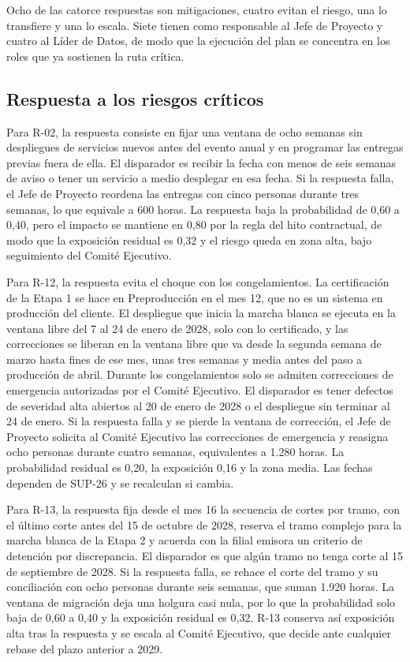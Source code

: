 \documentclass[11pt]{article}
\begin{document}
Ocho de las catorce respuestas son mitigaciones, cuatro evitan el riesgo, una lo transfiere y una lo escala. Siete tienen como responsable al Jefe de Proyecto y cuatro al Líder de Datos, de modo que la ejecución del plan se concentra en los roles que ya sostienen la ruta crítica.

\subsection{Respuesta a los riesgos críticos}

Para R-02, la respuesta consiste en fijar una ventana de ocho semanas sin despliegues de servicios nuevos antes del evento anual y en programar las entregas previas fuera de ella. El disparador es recibir la fecha con menos de seis semanas de aviso o tener un servicio a medio desplegar en esa fecha. Si la respuesta falla, el Jefe de Proyecto reordena las entregas con cinco personas durante tres semanas, lo que equivale a 600 horas. La respuesta baja la probabilidad de 0,60 a 0,40, pero el impacto se mantiene en 0,80 por la regla del hito contractual, de modo que la exposición residual es 0,32 y el riesgo queda en zona alta, bajo seguimiento del Comité Ejecutivo.

Para R-12, la respuesta evita el choque con los congelamientos. La certificación de la Etapa 1 se hace en Preproducción en el mes 12, que no es un sistema en producción del cliente. El despliegue que inicia la marcha blanca se ejecuta en la ventana libre del 7 al 24 de enero de 2028, solo con lo certificado, y las correcciones se liberan en la ventana libre que va desde la segunda semana de marzo hasta fines de ese mes, unas tres semanas y media antes del paso a producción de abril. Durante los congelamientos solo se admiten correcciones de emergencia autorizadas por el Comité Ejecutivo. El disparador es tener defectos de severidad alta abiertos al 20 de enero de 2028 o el despliegue sin terminar al 24 de enero. Si la respuesta falla y se pierde la ventana de corrección, el Jefe de Proyecto solicita al Comité Ejecutivo las correcciones de emergencia y reasigna ocho personas durante cuatro semanas, equivalentes a 1.280 horas. La probabilidad residual es 0,20, la exposición 0,16 y la zona media. Las fechas dependen de SUP-26 y se recalculan si cambia.

Para R-13, la respuesta fija desde el mes 16 la secuencia de cortes por tramo, con el último corte antes del 15 de octubre de 2028, reserva el tramo complejo para la marcha blanca de la Etapa 2 y acuerda con la filial emisora un criterio de detención por discrepancia. El disparador es que algún tramo no tenga corte al 15 de septiembre de 2028. Si la respuesta falla, se rehace el corte del tramo y su conciliación con ocho personas durante seis semanas, que suman 1.920 horas. La ventana de migración deja una holgura casi nula, por lo que la probabilidad solo baja de 0,60 a 0,40 y la exposición residual es 0,32. R-13 conserva así exposición alta tras la respuesta y se escala al Comité Ejecutivo, que decide ante cualquier rebase del plazo anterior a 2029.
\end{document}
